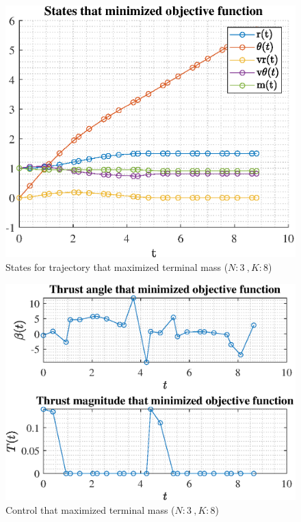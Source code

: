 \documentclass[]{article}
\begin{document}
\begin{figure}
	\centering
	\includegraphics[scale=0.75]{states_N3_K8_C2_mf.eps}
	\caption{States for trajectory that maximized terminal mass (\(N:3\ , K:8\))}
	\label{fig:states_N3_K8_C2_mf}
\end{figure}
\begin{figure}
	\centering
	\includegraphics[scale=0.75]{control_N3_K8_C2_mf.eps}
	\caption{Control that maximized terminal mass (\(N:3\ , K:8\))}
	\label{fig:control_N3_K8_C2_mf}
\end{figure}
\end{document}
